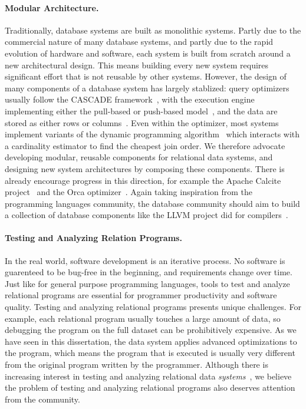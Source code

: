 \paragraph*{Modular Architecture.}
Traditionally, database systems are built as monolithic systems.
Partly due to the commercial nature of many database systems, 
 and partly due to the rapid evolution of hardware and software,
 each system is built from scratch 
 around a new architectural design.
This means building every new system requires significant effort
 that is not reusable by other systems.
However, the design of many components of a database system 
 has largely stablized:
 query optimizers usually follow the \textsf{CASCADE} framework~\cite{Graefe95a},
 with the execution engine implementing either the pull-based or push-based model~\cite{DBLP:journals/pvldb/KerstenLKNPB18},
 and the data are stored as either rows or columns~\cite{DBLP:journals/ftdb/AbadiBHIM13}.
Even within the optimizer, most systems implement variants of the dynamic programming algorithm~\cite{DBLP:conf/vldb/MoerkotteN06}
 which interacts with a cardinality estimator to find the cheapest join order.
We therefore advocate developing modular, reusable components 
 for relational data systems, 
 and designing new system architectures by composing these components.
There is already encourage progress in this direction, 
 for example the Apache Calcite project~\cite{begoli2018apache} and 
 the Orca optimizer~\cite{DBLP:conf/sigmod/SolimanAREGSCGRPWNKB14}.
Again taking inspiration from the programming languages community, 
 the database community should aim to build a collection of 
 database components like the LLVM project did for compilers~\cite{DBLP:conf/cgo/LattnerA04}.

\paragraph*{Testing and Analyzing Relation Programs.}
In the real world, software development is an iterative process.
No software is guarenteed to be bug-free in the beginning, 
 and requirements change over time.
Just like for general purpose programming languages,
 tools to test and analyze relational programs are essential
 for programmer productivity and software quality.
Testing and analyzing relational programs presents unique challenges.
For example, each relational program usually touches a large amount of data, 
 so debugging the program on the full dataset can be prohibitively expensive.
As we have seen in this dissertation, 
 the data system applies advanced optimizations to the program,
 which means the program that is executed is usually very different
 from the original program written by the programmer.
Although there is increasing interest 
 in testing and analyzing relational data {\em systems}~\cite{DBLP:journals/pacmpl/RiggerS20,DBLP:conf/osdi/RiggerS20,DBLP:conf/sigsoft/RiggerS20},
 we believe the problem of testing and analyzing relational programs
 also deserves attention from the community.